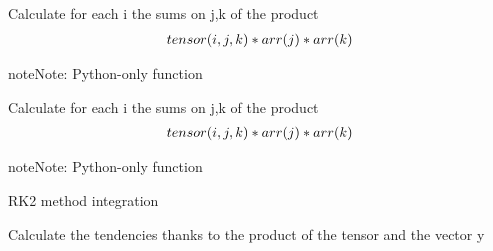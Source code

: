 \documentclass[letterpaper,10pt,english]{sphinxmanual}
\begin{document}
\begin{fulllineitems}
\label{rstfiles/integrator:integrator.sparse_mul3}
Calculate for each i the sums on j,k of the product
\begin{gather}
\begin{split}tensor(i,j,k)* arr(j) * arr(k)\end{split}\notag
\end{gather}
\begin{notice}{note}{Note:}
Python-only function
\end{notice}

\end{fulllineitems}


\begin{fulllineitems}
\label{rstfiles/integrator:integrator.sparse_mul3_py}
Calculate for each i the sums on j,k of the product
\begin{gather}
\begin{split}tensor(i,j,k)* arr(j) * arr(k)\end{split}\notag
\end{gather}
\begin{notice}{note}{Note:}
Python-only function
\end{notice}

\end{fulllineitems}


\begin{fulllineitems}
\label{rstfiles/integrator:integrator.step}
RK2 method integration

\end{fulllineitems}


\begin{fulllineitems}
\label{rstfiles/integrator:integrator.tendencies}
Calculate the tendencies thanks to the product of the tensor and     the vector y

\end{fulllineitems}
\end{document}
